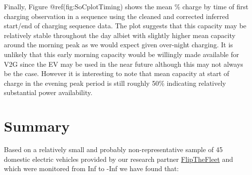 \documentclass[]{article}
\begin{document}
Finally, Figure @ref(fig:SoCplotTiming) shows the mean \% charge by time of first charging observation in a sequence using the cleaned and corrected inferred start/end of charging sequence data. The plot suggests that this capacity may be relatively stable throughout the day albiet with slightly higher mean capacity around the morning peak as we would expect given over-night charging. It is unlikely that this early morning capacity would be willingly made available for V2G since the EV may be used in the near future although this may not always be the case. However it is interesting to note that mean capacity at start of charge in the evening peak period is still roughly 50\% indicating relatively substantial power availability.

\hypertarget{summary}{%
\section{Summary}\label{summary}}

Based on a relatively small and probably non-representative sample of 45 domestic electric vehicles provided by our research partner \href{https://flipthefleet.org/}{FlipTheFleet} and which were monitored from Inf to -Inf we have found that:
\end{document}
